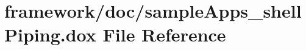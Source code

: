 \hypertarget{sample_apps__shell_piping_8dox}{}\section{framework/doc/sample\+Apps\+\_\+shell\+Piping.dox File Reference}
\label{sample_apps__shell_piping_8dox}
